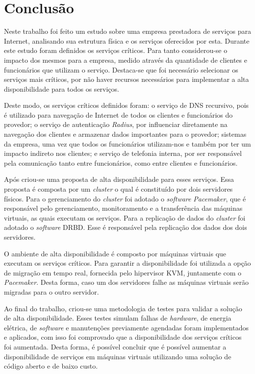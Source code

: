 \chapter{Conclusão}
\label{cap:conclusao}

Neste trabalho foi feito um estudo sobre uma empresa prestadora de serviços para Internet, analisando sua estrutura física e os serviços oferecidos 
por esta. Durante este estudo foram definidos os serviços críticos. Para tanto considerou-se o impacto dos mesmos para a empresa, medido através
da quantidade de clientes e funcionários que utilizam o serviço. Destaca-se que foi necessário selecionar os serviços mais críticos, por não 
haver recursos necessários para implementar a alta disponibilidade para todos os serviços.

Deste modo, os serviços críticos definidos foram: o serviço de \ac{DNS} recursivo, pois é utilizado para navegação de Internet de todos os clientes 
e funcionários do provedor; o serviço de autenticação \textit{Radius}, por influenciar diretamente na navegação dos clientes e armazenar dados 
importantes para o provedor; sistemas da empresa, uma vez que todos os funcionários utilizam-nos e também por ter um impacto indireto nos 
clientes; e serviço de telefonia interna, por ser responsável pela comunicação tanto entre funcionários, como entre clientes e funcionários.

Após criou-se uma proposta de alta disponibilidade para esses serviços. Essa proposta é composta por um \textit{cluster} o qual é constituído 
por dois servidores físicos. Para o gerenciamento do \textit{cluster} foi adotado o \textit{software} \textit{Pacemaker}, que é responsável pelo 
gerenciamento, monitoramento e a transferência das máquinas virtuais, as quais executam os serviços. Para a replicação de dados 
do \textit{cluster} foi adotado o \textit{software} \ac{DRBD}. Esse é responsável pela replicação dos dados dos dois servidores.

O ambiente de alta disponibilidade é composto por máquinas virtuais que executam os serviços críticos. Para garantir a disponibilidade 
foi utilizada a opção de migração em tempo real, fornecida pelo hipervisor \ac{KVM}, juntamente com o \textit{Pacemaker}. Desta forma, 
caso um dos servidores falhe as máquinas virtuais serão migradas para o outro servidor.

Ao final do trabalho, criou-se uma metodologia de testes para validar a solução de alta disponibilidade. Esses testes simulam falhas de 
\textit{hardware}, de energia elétrica, de \textit{software} e manutenções previamente agendadas foram implementados e aplicados, com isso
foi comprovado que a disponibilidade dos serviços críticos foi aumentada.
Desta forma, é possível concluir que é possível aumentar a disponibilidade de serviços em máquinas virtuais utilizando uma solução de
código aberto e de baixo custo.

